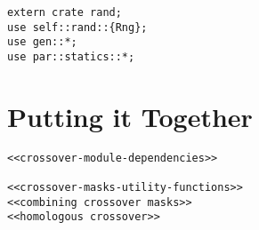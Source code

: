 \documentclass[11pt]{article}
\begin{document}
\lstset{language=rust,label=orge108ef8,caption= ,captionpos=b,numbers=none}
\begin{lstlisting}
extern crate rand;
use self::rand::{Rng};
use gen::*;
use par::statics::*;
\end{lstlisting}


\section{Putting it Together}
\label{sec:org3f372d6}
\lstset{language=rust,label=org17addcc,caption= ,captionpos=b,numbers=none}
\begin{lstlisting}
<<crossover-module-dependencies>>

<<crossover-masks-utility-functions>>
<<combining crossover masks>>
<<homologous crossover>>
\end{lstlisting}
\end{document}
